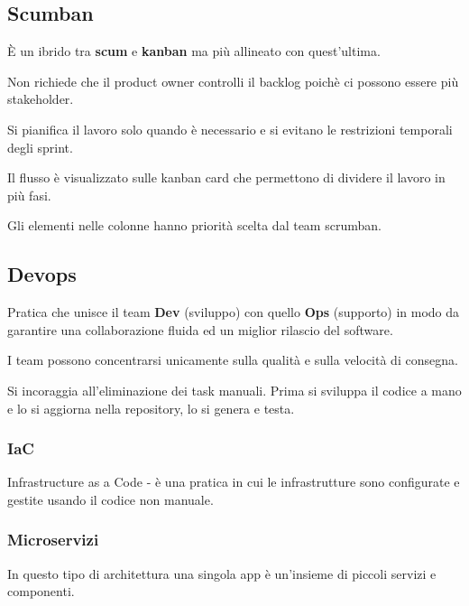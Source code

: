 \documentclass{report}
\begin{document}
\subsection*{Scumban}
\`E un ibrido tra \textbf{scum} e \textbf{kanban} ma più allineato con quest'ultima.

\noindent
Non richiede che il product owner controlli il backlog poichè ci possono essere più stakeholder.

\noindent
Si pianifica il lavoro solo quando è necessario e si evitano le restrizioni temporali degli sprint.

\noindent
Il flusso è visualizzato sulle kanban card che permettono di dividere il lavoro in più fasi. 

\noindent
Gli elementi nelle colonne hanno priorità scelta dal team scrumban.

\subsection*{Devops}
Pratica che unisce il team \textbf{Dev} (sviluppo) con quello \textbf{Ops} (supporto) in modo da garantire una collaborazione fluida ed un miglior rilascio del software.

\noindent
I team possono concentrarsi unicamente sulla qualità e sulla velocità di consegna.

\medskip
\noindent
Si incoraggia all'eliminazione dei task manuali. Prima si sviluppa il codice a mano e lo si aggiorna nella repository, lo si genera e testa.

\subsubsection*{IaC}
Infrastructure as a Code - è una pratica in cui le infrastrutture sono configurate e gestite usando il codice non manuale.

\subsubsection*{Microservizi}
In questo tipo di architettura una singola app è un'insieme di piccoli servizi e componenti.
\end{document}
